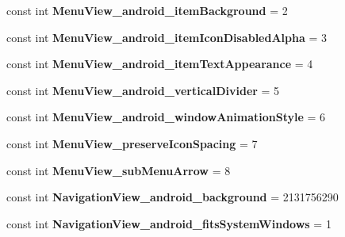 \begin{DoxyCompactItemize}
const int {\bfseries Menu\+View\+\_\+android\+\_\+item\+Background} = 2
\item 
\mbox{\label{classst_delivery_1_1_resource_1_1_styleable_a6e0f5014bb0fa8a8cdd8f33c3adadcee}} 
const int {\bfseries Menu\+View\+\_\+android\+\_\+item\+Icon\+Disabled\+Alpha} = 3
\item 
\mbox{\label{classst_delivery_1_1_resource_1_1_styleable_a9f70988d1f172adf32aad8650ffd5325}} 
const int {\bfseries Menu\+View\+\_\+android\+\_\+item\+Text\+Appearance} = 4
\item 
\mbox{\label{classst_delivery_1_1_resource_1_1_styleable_a08005e790e66454f2ebca0fa8337f1ce}} 
const int {\bfseries Menu\+View\+\_\+android\+\_\+vertical\+Divider} = 5
\item 
\mbox{\label{classst_delivery_1_1_resource_1_1_styleable_a1755a5d5f3200716fc30e1bb90524b5b}} 
const int {\bfseries Menu\+View\+\_\+android\+\_\+window\+Animation\+Style} = 6
\item 
\mbox{\label{classst_delivery_1_1_resource_1_1_styleable_af2c54add46cbee4bcdb3202e8369f19d}} 
const int {\bfseries Menu\+View\+\_\+preserve\+Icon\+Spacing} = 7
\item 
\mbox{\label{classst_delivery_1_1_resource_1_1_styleable_a891a1956c36739936fa2bdd8f4a4859b}} 
const int {\bfseries Menu\+View\+\_\+sub\+Menu\+Arrow} = 8
\item 
\mbox{\label{classst_delivery_1_1_resource_1_1_styleable_a6a7f8ac67d404730e75c1302a022b686}} 
const int {\bfseries Navigation\+View\+\_\+android\+\_\+background} = 2131756290
\item 
\mbox{\label{classst_delivery_1_1_resource_1_1_styleable_a6089e23607c6f865a288bbf32e8e5779}} 
const int {\bfseries Navigation\+View\+\_\+android\+\_\+fits\+System\+Windows} = 1
\item 
\mbox{\label{classst_delivery_1_1_resource_1_1_styleable_ad424d71f1a1f4929766a491e7e667586}} 

\end{DoxyCompactItemize}
